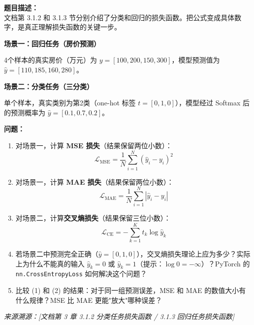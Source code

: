 \documentclass[a4paper,11pt]{ctexart}
\begin{document}
\begin{problembox}
    \textbf{题目描述：}\\
    文档第 3.1.2 和 3.1.3 节分别介绍了分类和回归的损失函数。把公式变成具体数字，是真正理解损失函数的关键一步。

    \vspace{0.3cm}
    \textbf{场景一：回归任务（房价预测）}

    4个样本的真实房价（万元）为 $y = [100, 200, 150, 300]$，模型预测值为 $\hat{y} = [110, 185, 160, 280]$。

    \vspace{0.2cm}
    \textbf{场景二：分类任务（三分类）}

    单个样本，真实类别为第2类（one-hot 标签 $t = [0, 1, 0]$），模型经过 Softmax 后的预测概率为 $\hat{y} = [0.1, 0.7, 0.2]$。

    \vspace{0.3cm}
    \textbf{问题：}
    \begin{enumerate}[(1)]
        \item 对场景一，计算 \textbf{MSE 损失}（结果保留两位小数）：
        \[
        \mathcal{L}_{\text{MSE}} = \frac{1}{N}\sum_{i=1}^{N}(\hat{y}_i - y_i)^2
        \]

        \item 对场景一，计算 \textbf{MAE 损失}（结果保留两位小数）：
        \[
        \mathcal{L}_{\text{MAE}} = \frac{1}{N}\sum_{i=1}^{N}|\hat{y}_i - y_i|
        \]

        \item 对场景二，计算\textbf{交叉熵损失}（结果保留三位小数）：
        \[
        \mathcal{L}_{\text{CE}} = -\sum_{k=1}^{K} t_k \log \hat{y}_k
        \]

        \item 若场景二中预测完全正确（$\hat{y} = [0, 1, 0]$），交叉熵损失理论上应为多少？实际上为什么不能真的输入 $\hat{y}_k = 0$ 或 $\hat{y}_k = 1$（提示：$\log 0 = -\infty$）？PyTorch 的 \texttt{nn.CrossEntropyLoss} 如何解决这个问题？

        \item 比较 (1) 和 (2) 的结果：对于同一组预测误差，MSE 和 MAE 的数值大小有什么规律？MSE 比 MAE 更能"放大"哪种误差？
    \end{enumerate}

    \vspace{0.2cm}
    {\color{gray}\small\textit{来源溯源：[文档第 3 章 3.1.2 分类任务损失函数 / 3.1.3 回归任务损失函数]}}
\end{problembox}
\end{document}
